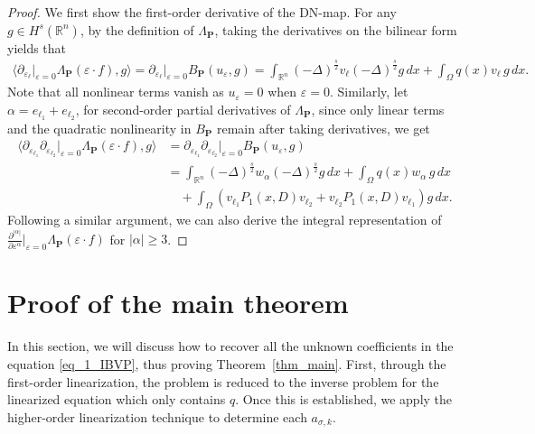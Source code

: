 \documentclass [oneside,11pt] {amsart}
\numberwithin{equation}{section}
\newcommand{\R}{\mathbb{R}}
\newcommand{\p}{\partial}
\newcommand{\dx}{\,dx}
\newcommand{\LC}{\left(}
\newcommand{\RC}{\right)}
\newcommand{\LA}{\langle}
\newcommand{\RA}{\rangle}
\begin{document}
\begin{proof}
We first show the first-order derivative of the DN-map. 
For any $g\in H^s(\R^n)$, by the definition of $\Lambda_\mathbf{P}$, taking the derivatives on the bilinear form yields that 
\begin{align*}
\LA \p _{\varepsilon_\ell}\big|_{\varepsilon=0}\Lambda_\mathbf{P}(\varepsilon\cdot f),g\RA =\p_{\varepsilon_{\ell}} \big|_{\varepsilon=0}B_\mathbf{P}(u_\varepsilon,g) = \int_{\R^n}(-\Delta)^{\frac{s}{2}}v_\ell (-\Delta)^{\frac{s}{2}}g \dx + \int_\Omega q(x)v_\ell\, g \dx.
\end{align*}
Note that all nonlinear terms vanish as $u_\varepsilon=0$ when $\varepsilon=0$. 
Similarly, let $\alpha=e_{\ell_1}+e_{\ell_2}$, for second-order partial derivatives of $\Lambda_\mathbf{P}$, since only linear terms and the quadratic nonlinearity in $B_\mathbf{P}$ remain after taking derivatives, we get
\begin{align*}
\LA \p_{\varepsilon_{\ell_1}} \p_{\varepsilon_{\ell_2}} \big|_{\varepsilon=0}\Lambda_\mathbf{P}(\varepsilon\cdot f),g \RA &=\p_{\varepsilon_{\ell_1}} \p_{\varepsilon_{\ell_2}} \big|_{\varepsilon=0}B_\mathbf{P}(u_\varepsilon,g)\\
&=\int_{\R^n} (-\Delta)^{\frac{s}{2}}w_{\alpha} (-\Delta)^{\frac{s}{2}}g \dx + \int_\Omega q(x) w_{\alpha}\, g  \dx\\
&\quad
+\int_{\Omega} \LC v_{\ell_1}P_1(x,D)v_{\ell_2}  + v_{\ell_2}P_1(x,D)v_{\ell_1} \RC g \dx.
\end{align*}
Following a similar argument, we can also derive the integral representation of  
$\frac{\p^{|\alpha|}}{\p \varepsilon^\alpha}
\Big|_{\varepsilon=0}\Lambda_\mathbf{P}(\varepsilon\cdot f)$ for $|\alpha|\geq 3$.
\end{proof}







\section{Proof of the main theorem}\label{sec:proof of theorem}
In this section, we will discuss how to recover all the unknown coefficients in the equation \eqref{eq_1_IBVP}, thus proving Theorem~\ref{thm_main}. First, through the first-order linearization, the problem is reduced to the inverse problem for the linearized equation which only contains $q$. Once this is established, we apply the higher-order linearization technique to determine each $a_{\sigma,k}$.
\end{document}
